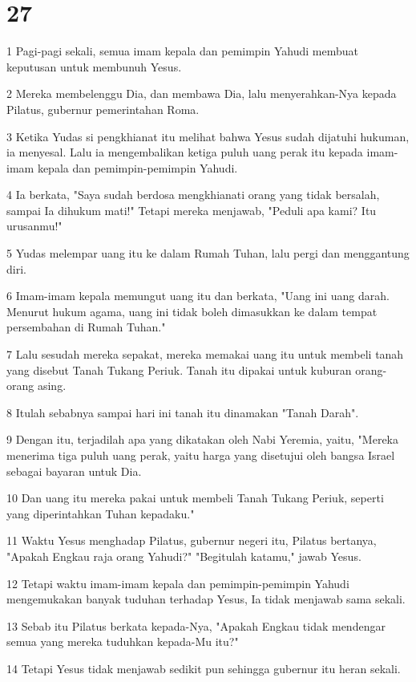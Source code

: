\chapter{27}

\par 1 Pagi-pagi sekali, semua imam kepala dan pemimpin Yahudi membuat keputusan untuk membunuh Yesus.
\par 2 Mereka membelenggu Dia, dan membawa Dia, lalu menyerahkan-Nya kepada Pilatus, gubernur pemerintahan Roma.
\par 3 Ketika Yudas si pengkhianat itu melihat bahwa Yesus sudah dijatuhi hukuman, ia menyesal. Lalu ia mengembalikan ketiga puluh uang perak itu kepada imam-imam kepala dan pemimpin-pemimpin Yahudi.
\par 4 Ia berkata, "Saya sudah berdosa mengkhianati orang yang tidak bersalah, sampai Ia dihukum mati!" Tetapi mereka menjawab, "Peduli apa kami? Itu urusanmu!"
\par 5 Yudas melempar uang itu ke dalam Rumah Tuhan, lalu pergi dan menggantung diri.
\par 6 Imam-imam kepala memungut uang itu dan berkata, "Uang ini uang darah. Menurut hukum agama, uang ini tidak boleh dimasukkan ke dalam tempat persembahan di Rumah Tuhan."
\par 7 Lalu sesudah mereka sepakat, mereka memakai uang itu untuk membeli tanah yang disebut Tanah Tukang Periuk. Tanah itu dipakai untuk kuburan orang-orang asing.
\par 8 Itulah sebabnya sampai hari ini tanah itu dinamakan "Tanah Darah".
\par 9 Dengan itu, terjadilah apa yang dikatakan oleh Nabi Yeremia, yaitu, "Mereka menerima tiga puluh uang perak, yaitu harga yang disetujui oleh bangsa Israel sebagai bayaran untuk Dia.
\par 10 Dan uang itu mereka pakai untuk membeli Tanah Tukang Periuk, seperti yang diperintahkan Tuhan kepadaku."
\par 11 Waktu Yesus menghadap Pilatus, gubernur negeri itu, Pilatus bertanya, "Apakah Engkau raja orang Yahudi?" "Begitulah katamu," jawab Yesus.
\par 12 Tetapi waktu imam-imam kepala dan pemimpin-pemimpin Yahudi mengemukakan banyak tuduhan terhadap Yesus, Ia tidak menjawab sama sekali.
\par 13 Sebab itu Pilatus berkata kepada-Nya, "Apakah Engkau tidak mendengar semua yang mereka tuduhkan kepada-Mu itu?"
\par 14 Tetapi Yesus tidak menjawab sedikit pun sehingga gubernur itu heran sekali.
